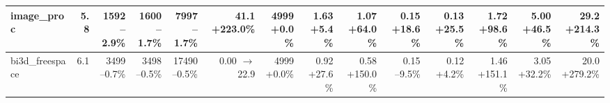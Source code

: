 \begin{table}[t]
{\begin{tabular}{lrrrrrrrrrrrrr}
\midrule
image\_proc & 5.8 & \makecell[r]{1592\\--2.9\%} & \makecell[r]{1600\\--1.7\%} & \makecell[r]{7997\\--1.7\%} & \makecell[r]{41.1\\+223.0\%} & \makecell[r]{4999\\+0.0\%} & \makecell[r]{1.63\\+5.4\%} & \makecell[r]{1.07\\+64.0\%} & \makecell[r]{0.15\\+18.6\%} & \makecell[r]{0.13\\+25.5\%} & \makecell[r]{1.72\\+98.6\%} & \makecell[r]{5.00\\+46.5\%} & \makecell[r]{29.2\\+214.3\%} \\
\midrule
bi3d\_freespace & 6.1 & \makecell[r]{3499\\--0.7\%} & \makecell[r]{3498\\--0.5\%} & \makecell[r]{17490\\--0.5\%} & \makecell[r]{0.00\\$\rightarrow$22.9} & \makecell[r]{4999\\+0.0\%} & \makecell[r]{0.92\\+27.6\%} & \makecell[r]{0.58\\+150.0\%} & \makecell[r]{0.15\\--9.5\%} & \makecell[r]{0.12\\+4.2\%} & \makecell[r]{1.46\\+151.1\%} & \makecell[r]{3.05\\+32.2\%} & \makecell[r]{20.0\\+279.2\%} \\
\bottomrule
\end{tabular}}
\end{table}
